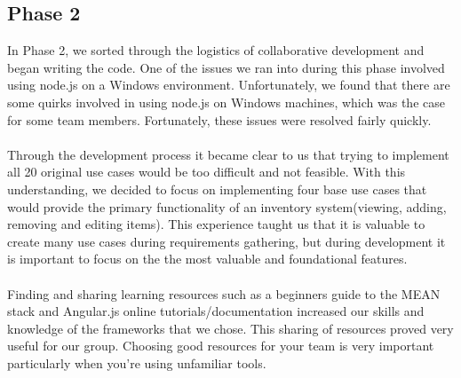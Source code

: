 \documentclass[letterpaper, 12pt]{article}
\begin{document}
\subsection{Phase 2}
\noindent In Phase 2, we sorted through the logistics of collaborative development and began writing the code. One of the issues we ran into during this phase involved using node.js on a Windows environment. Unfortunately, we found that there are some quirks involved in using node.js on Windows machines, which was the case for some team members.  Fortunately, these issues were resolved fairly quickly. \\\\ 
Through the development process it became clear to us that trying to implement all 20 original use cases would be too difficult and not feasible. With this understanding, we decided to focus on implementing four base use cases that would provide the primary functionality of an inventory system(viewing, adding, removing and editing items). This experience taught us that it is valuable to create many use cases during requirements gathering, but during development it is important to focus on the the most valuable and foundational features.\\\\
Finding and sharing learning resources such as a beginners guide to the MEAN stack and Angular.js online tutorials/documentation increased our skills and knowledge of the frameworks that we chose. This sharing of resources proved very useful for our group. Choosing good resources for your team is very important particularly when you're using unfamiliar tools.
\end{document}
